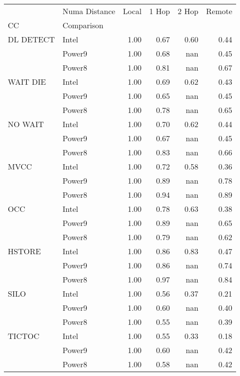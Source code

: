 \begin{tabular}{llrrrr}
\toprule
       & Numa Distance &  Local &  1 Hop &  2 Hop &  Remote \\
CC & Comparison &        &        &        &         \\
\midrule
DL DETECT & Intel &   1.00 &   0.67 &   0.60 &    0.44 \\
       & Power9 &   1.00 &   0.68 &    nan &    0.45 \\
       & Power8 &   1.00 &   0.81 &    nan &    0.67 \\
WAIT DIE & Intel &   1.00 &   0.69 &   0.62 &    0.43 \\
       & Power9 &   1.00 &   0.65 &    nan &    0.45 \\
       & Power8 &   1.00 &   0.78 &    nan &    0.65 \\
NO WAIT & Intel &   1.00 &   0.70 &   0.62 &    0.44 \\
       & Power9 &   1.00 &   0.67 &    nan &    0.45 \\
       & Power8 &   1.00 &   0.83 &    nan &    0.66 \\
MVCC & Intel &   1.00 &   0.72 &   0.58 &    0.36 \\
       & Power9 &   1.00 &   0.89 &    nan &    0.78 \\
       & Power8 &   1.00 &   0.94 &    nan &    0.89 \\
OCC & Intel &   1.00 &   0.78 &   0.63 &    0.38 \\
       & Power9 &   1.00 &   0.89 &    nan &    0.65 \\
       & Power8 &   1.00 &   0.79 &    nan &    0.62 \\
HSTORE & Intel &   1.00 &   0.86 &   0.83 &    0.47 \\
       & Power9 &   1.00 &   0.86 &    nan &    0.74 \\
       & Power8 &   1.00 &   0.97 &    nan &    0.84 \\
SILO & Intel &   1.00 &   0.56 &   0.37 &    0.21 \\
       & Power9 &   1.00 &   0.60 &    nan &    0.40 \\
       & Power8 &   1.00 &   0.55 &    nan &    0.39 \\
TICTOC & Intel &   1.00 &   0.55 &   0.33 &    0.18 \\
       & Power9 &   1.00 &   0.60 &    nan &    0.42 \\
       & Power8 &   1.00 &   0.58 &    nan &    0.42 \\
\bottomrule
\end{tabular}
